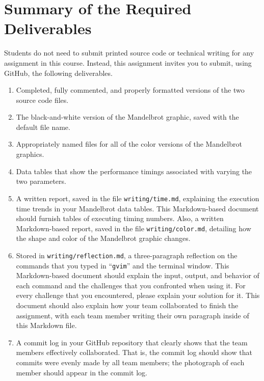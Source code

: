 \documentclass[11pt]{article}
\newcommand{\reflection}{\lstinline{writing/reflection.md}}
\newcommand{\timefile}{\lstinline{writing/time.md}}
\newcommand{\colorfile}{\lstinline{writing/color.md}}
\newcommand{\command}[1]{``\lstinline{#1}''}
\begin{document}
\section*{Summary of the Required Deliverables}

\noindent Students do not need to submit printed source code or technical writing for any assignment in this course.
Instead, this assignment invites you to submit, using GitHub, the following deliverables.

\begin{enumerate}

  \setlength{\itemsep}{0in}

  \item Completed, fully commented, and properly formatted versions of the two source code files.
  \item The black-and-white version of the Mandelbrot graphic, saved with the default file name.
  \item Appropriately named files for all of the color versions of the Mandelbrot graphics.
  \item Data tables that show the performance timings associated with varying the two parameters.

  \item A written report, saved in the file \timefile{}, explaining the execution time trends in your Mandelbrot data
    tables. This Markdown-based document should furnish tables of executing timing numbers. Also, a written
    Markdown-based report, saved in the file \colorfile{}, detailing how the shape and color of the Mandelbrot graphic
    changes.

  \item Stored in \reflection{}, a three-paragraph reflection on the commands that you typed in \command{gvim} and the
    terminal window. This Markdown-based document should explain the input, output, and behavior of each command and the
    challenges that you confronted when using it. For every challenge that you encountered, please explain your solution
    for it. This document should also explain how your team collaborated to finish the assignment, with each team member
    writing their own paragraph inside of this Markdown file.

  \item A commit log in your GitHub repository that clearly shows that the team members effectively collaborated. That is,
    the commit log should show that commits were evenly made by all team members; the photograph of each member should
    appear in the commit log.

\end{enumerate}
\end{document}
